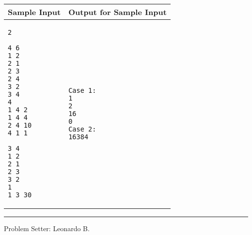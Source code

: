 \documentclass[12pt]{article}
\newcommand{\FFATitle}[1]{{%
  \color{tango-skyblue-2}\sffamily\large\bfseries\hspace{-0.4em} #1}}
\begin{document}
\begin{tabular}{|l|l|}
  \hline
  \FFATitle{Sample Input} &
  \FFATitle{Output for Sample Input} \\
  \hline
  \begin{minipage}[t]{0.48\textwidth}
    \vspace{-8pt}
    \begin{verbatim}2

4 6
1 2
2 1
2 3
2 4
3 2
3 4
4
1 4 2
1 4 4
2 4 10
4 1 1

3 4
1 2
2 1
2 3
3 2
1
1 3 30\end{verbatim}
    \vspace{-4pt}
  \end{minipage} &
  \begin{minipage}[t]{0.48\textwidth}
    \vspace{-8pt}
    \begin{verbatim}Case 1:
1
2
16
0
Case 2:
16384\end{verbatim}
    \vspace{-4pt}
  \end{minipage} \\
  \hline
\end{tabular}

\begin{center}\rule{3in}{0.4pt}\end{center}

Problem Setter: Leonardo B.
\end{document}
